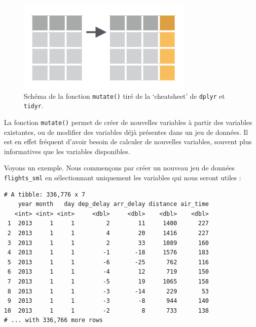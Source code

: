 \documentclass[
  a4paper,
]{article}
\newenvironment{Shaded}{\begin{snugshade}}{\end{snugshade}}
\newcommand{\KeywordTok}[1]{\textcolor[rgb]{0.12,0.11,0.11}{\textbf{#1}}}
\newcommand{\NormalTok}[1]{\textcolor[rgb]{0.12,0.11,0.11}{#1}}
\newcommand{\OperatorTok}[1]{\textcolor[rgb]{0.12,0.11,0.11}{#1}}
\newcommand{\StringTok}[1]{\textcolor[rgb]{0.75,0.01,0.01}{#1}}
\begin{document}
\begin{figure}[htpb]

{\centering \includegraphics[width=0.5\linewidth]{images/mutate} 

}

\caption{Schéma de la fonction \texttt{mutate()} tiré de la `cheatsheet' de \texttt{dplyr} et \texttt{tidyr}.}\label{fig:mutatefig}
\end{figure}



La fonction \texttt{mutate()} permet de créer de nouvelles variables à partir des variables existantes, ou de modifier des variables déjà présentes dans un jeu de données. Il est en effet fréquent d'avoir besoin de calculer de nouvelles variables, souvent plus informatives que les variables disponibles.

Voyons un exemple. Nous commençons par créer un nouveau jeu de données \texttt{flights\_sml} en sélectionnant uniquement les variables qui nous seront utiles :

\begin{Shaded}
\end{Shaded}

\begin{verbatim}
# A tibble: 336,776 x 7
    year month   day dep_delay arr_delay distance air_time
   <int> <int> <int>     <dbl>     <dbl>    <dbl>    <dbl>
 1  2013     1     1         2        11     1400      227
 2  2013     1     1         4        20     1416      227
 3  2013     1     1         2        33     1089      160
 4  2013     1     1        -1       -18     1576      183
 5  2013     1     1        -6       -25      762      116
 6  2013     1     1        -4        12      719      150
 7  2013     1     1        -5        19     1065      158
 8  2013     1     1        -3       -14      229       53
 9  2013     1     1        -3        -8      944      140
10  2013     1     1        -2         8      733      138
# ... with 336,766 more rows
\end{verbatim}
\end{document}
